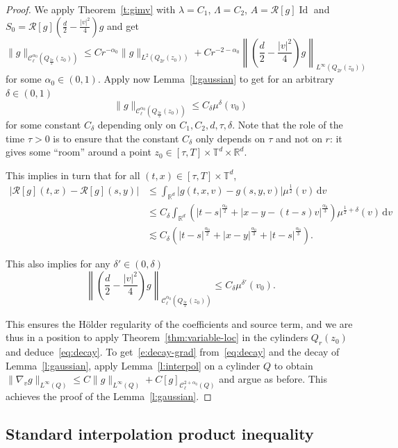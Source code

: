 \documentclass[10pt]{amsart}
\theoremstyle{definition}\newtheorem{defi}[theo]{Definition}\newtheorem{rema}[theo]{Remark}\newtheorem{exam}[theo]{Example}\newtheorem{exem}[theo]{Example}\newtheorem{nota}[theo]{Notation}
\newcommand{\R}{\mathbb{R}}
\newcommand{\T}{\mathbb{T}}
\newcommand{\cC}{\mathcal{C}}
\newcommand*\fR{\mathcal{R}}
\DeclareMathOperator{\Id}{Id}
\newcommand{\dd}{{\, \mathrm d}}
\begin{document}
\begin{proof}
We apply Theorem~\ref{t:gimv} with $\lambda = C_1$, $\Lambda = C_2$, $A = \fR[g] \Id$ and $S_0 = \fR[g](\frac{d}2-\frac{|v|^2}4)g$ and get
\[
\| g\|_{\cC_\ell^{{\alpha_0}}\left(Q_{\frac{3r}2}(z_0)\right)}
\le C r^{-{\alpha_0}} \| g \|_{L^2\left(Q_{2r}(z_0)\right)} + C r^{-2-{\alpha_0}}
\left\|\left(\frac{d}2 - \frac{|v|^2}4\right)g \right\|_{L^\infty\left(Q_{2r}(z_0)\right)}
\]
for some $\alpha_0 \in (0,1)$. Apply now Lemma~\ref{l:gaussian} to get for an arbitrary $\delta \in (0,1)$
\[
\| g\|_{\cC_\ell^{{\alpha_0}}\left(Q_{\frac{3r}2}(z_0)\right)} \le C_\delta \mu^{\delta}(v_0)
\]
for some constant $C_\delta$ depending only on $C_1, C_2, d,\tau, \delta$. Note that the role of the time $\tau>0$ is to ensure that the constant $C_\delta$ only depends on $\tau$ and not on $r$: it gives some ``room'' around a point $z_0 \in [\tau,T] \times \T^d \times \R^d$.

This implies in turn that for all $(t,x) \in [\tau,T] \times \T^d$,
\begin{align*}
\left|\fR[g](t,x) - \fR[g](s,y)\right| & \le \int_{\R^d} \left| g (t,x,v) - g (s,y,v)\right|\mu^{\frac12} (v) \dd v \\
& \le C_\delta \int_{\R^d} \left(|t-s|^{\frac{\alpha_0}2} + |x-y - (t-s)v|^{\frac{\alpha_0}3} \right) \mu^{\frac12+\delta} (v) \dd v \\
& \lesssim C_\delta \left(|t-s|^{\frac{\alpha_0}2} + |x-y|^{\frac{\alpha_0}3} + |t-s|^{\frac{\alpha_0}3}\right).
\end{align*}

This also implies for any $\delta' \in (0,\delta)$
\[
\left\|\left(\frac{d}2-\frac{|v|^2}4\right) g\right\| _{\cC_\ell^{{\alpha_0}}\left(Q_{\frac{3r}2}(z_0)\right)} \le C_\delta \mu^{\delta'}(v_0).
\]

This ensures the H\"older regularity of the coefficients and source term, and we are thus in a position to apply Theorem~\ref{thm:variable-loc} in the cylinders $Q_r (z_0)$ and deduce~\eqref{eq:decay}. To get~\eqref{e:decay-grad} from~\eqref{eq:decay} and the decay of Lemma~\ref{l:gaussian}, apply Lemma~\ref{l:interpol} on a cylinder $Q$ to obtain $\| \nabla_v g \|_{L^\infty(Q)} \le C \|g\|_{L^\infty(Q)} + C [g]_{\cC_\ell^{2+\alpha_0}(Q)}$ and argue as before. This achieves the proof of the Lemma~\ref{l:gaussian}.
\end{proof}


\subsection{Standard interpolation product inequality}\label{sec:stand-interp-prod}
\end{document}
